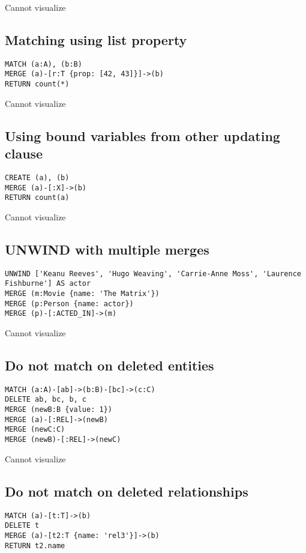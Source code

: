 Cannot visualize
\subsection{Matching using list property}

\begin{lstlisting}
MATCH (a:A), (b:B)
MERGE (a)-[r:T {prop: [42, 43]}]->(b)
RETURN count(*)
\end{lstlisting}

Cannot visualize
\subsection{Using bound variables from other updating clause}

\begin{lstlisting}
CREATE (a), (b)
MERGE (a)-[:X]->(b)
RETURN count(a)
\end{lstlisting}

Cannot visualize
\subsection{UNWIND with multiple merges}

\begin{lstlisting}
UNWIND ['Keanu Reeves', 'Hugo Weaving', 'Carrie-Anne Moss', 'Laurence Fishburne'] AS actor
MERGE (m:Movie {name: 'The Matrix'})
MERGE (p:Person {name: actor})
MERGE (p)-[:ACTED_IN]->(m)
\end{lstlisting}

Cannot visualize
\subsection{Do not match on deleted entities}

\begin{lstlisting}
MATCH (a:A)-[ab]->(b:B)-[bc]->(c:C)
DELETE ab, bc, b, c
MERGE (newB:B {value: 1})
MERGE (a)-[:REL]->(newB)
MERGE (newC:C)
MERGE (newB)-[:REL]->(newC)
\end{lstlisting}

Cannot visualize
\subsection{Do not match on deleted relationships}

\begin{lstlisting}
MATCH (a)-[t:T]->(b)
DELETE t
MERGE (a)-[t2:T {name: 'rel3'}]->(b)
RETURN t2.name
\end{lstlisting}

